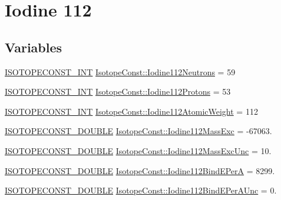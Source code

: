 \hypertarget{group___isotope_const-_iodine-_i112}{}\section{Iodine 112}
\label{group___isotope_const-_iodine-_i112}
\subsection*{Variables}
\begin{DoxyCompactItemize}
\item 
\mbox{\hyperlink{group___isotope_const-_macros_ga5f18360b3e99483a35c32d789e62621c}{I\+S\+O\+T\+O\+P\+E\+C\+O\+N\+S\+T\+\_\+\+I\+NT}} \mbox{\hyperlink{group___isotope_const-_iodine-_i112_gaad30176fa0b08690bf40109e71dc1ddc}{Isotope\+Const\+::\+Iodine112\+Neutrons}} = 59
\item 
\mbox{\hyperlink{group___isotope_const-_macros_ga5f18360b3e99483a35c32d789e62621c}{I\+S\+O\+T\+O\+P\+E\+C\+O\+N\+S\+T\+\_\+\+I\+NT}} \mbox{\hyperlink{group___isotope_const-_iodine-_i112_ga3b84699a7e63e5a551659592f47b2ebe}{Isotope\+Const\+::\+Iodine112\+Protons}} = 53
\item 
\mbox{\hyperlink{group___isotope_const-_macros_ga5f18360b3e99483a35c32d789e62621c}{I\+S\+O\+T\+O\+P\+E\+C\+O\+N\+S\+T\+\_\+\+I\+NT}} \mbox{\hyperlink{group___isotope_const-_iodine-_i112_gae15b6adbc18408532058028fcef65c13}{Isotope\+Const\+::\+Iodine112\+Atomic\+Weight}} = 112
\item 
\mbox{\hyperlink{group___isotope_const-_macros_ga8f45a7272ce02c0b4c65c44636ed719a}{I\+S\+O\+T\+O\+P\+E\+C\+O\+N\+S\+T\+\_\+\+D\+O\+U\+B\+LE}} \mbox{\hyperlink{group___isotope_const-_iodine-_i112_gaa9354f5506484a9227550d4e7144ec10}{Isotope\+Const\+::\+Iodine112\+Mass\+Exc}} = -\/67063.
\item 
\mbox{\hyperlink{group___isotope_const-_macros_ga8f45a7272ce02c0b4c65c44636ed719a}{I\+S\+O\+T\+O\+P\+E\+C\+O\+N\+S\+T\+\_\+\+D\+O\+U\+B\+LE}} \mbox{\hyperlink{group___isotope_const-_iodine-_i112_gac9524484cb8515b4f80acface47ac141}{Isotope\+Const\+::\+Iodine112\+Mass\+Exc\+Unc}} = 10.
\item 
\mbox{\hyperlink{group___isotope_const-_macros_ga8f45a7272ce02c0b4c65c44636ed719a}{I\+S\+O\+T\+O\+P\+E\+C\+O\+N\+S\+T\+\_\+\+D\+O\+U\+B\+LE}} \mbox{\hyperlink{group___isotope_const-_iodine-_i112_ga8258211e6bb6981009f2f5ad34f6a6b5}{Isotope\+Const\+::\+Iodine112\+Bind\+E\+PerA}} = 8299.
\item 
\mbox{\hyperlink{group___isotope_const-_macros_ga8f45a7272ce02c0b4c65c44636ed719a}{I\+S\+O\+T\+O\+P\+E\+C\+O\+N\+S\+T\+\_\+\+D\+O\+U\+B\+LE}} \mbox{\hyperlink{group___isotope_const-_iodine-_i112_ga119e05d815c053345eb35996bb434311}{Isotope\+Const\+::\+Iodine112\+Bind\+E\+Per\+A\+Unc}} = 0.

\end{DoxyCompactItemize}
